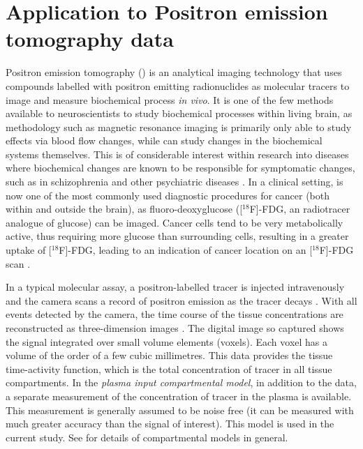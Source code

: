 \section{Application to Positron emission tomography data}
\label{sec:Application to Positron emission tomography data}

Positron emission tomography (\pet) is an analytical imaging technology that
uses compounds labelled with positron emitting radionuclides as molecular
tracers to image and measure biochemical process \emph{in vivo}. It is one of
the few methods available to neuroscientists to study biochemical processes
within living brain, as methodology such as magnetic resonance imaging is
primarily only able to study effects via blood flow changes, while \pet can
study changes in the biochemical systems themselves. This is of considerable
interest within research into diseases where biochemical changes are known to
be responsible for symptomatic changes, such as in schizophrenia and other
psychiatric diseases \cite{FrankleL2002}.  In a clinical setting, \pet is now
one of the most commonly used diagnostic procedures for cancer (both within
and outside the brain), as fluoro-deoxyglucose ([$^{18}$F]-FDG, an radiotracer
analogue of glucose) can be imaged. Cancer cells tend to be very metabolically
active, thus requiring more glucose than surrounding cells, resulting in a
greater uptake of [$^{18}$F]-FDG, leading to an indication of cancer location
on an [$^{18}$F]-FDG scan \cite{Gambhir2002}.

In a typical molecular assay, a positron-labelled tracer is injected
intravenously and the \pet camera scans a record of positron emission as
the tracer decays \cite{Phelps2000}.  With all events detected by the \pet
camera, the time course of the tissue concentrations are reconstructed as
three-dimension images \cite{Kinahan1989}. The digital image so captured
shows the signal integrated over small volume elements (voxels). Each voxel
has a volume of the order of a few cubic millimetres. This data provides
the tissue time-activity function, which is the total concentration of
tracer in all tissue compartments. In the \emph{plasma input compartmental
  model}, in addition to the \pet data, a separate measurement of the
concentration of tracer in the plasma is available. This measurement is
generally assumed to be noise free (it can be measured with much greater
accuracy than the signal of interest). This model is used in the current
study. See \cite{Gunn:2001cx} for details of \pet compartmental models in
general.

